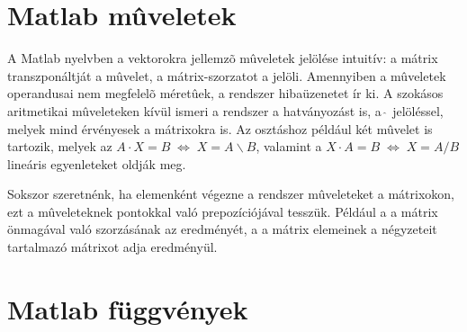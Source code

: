 \section{Matlab mûveletek}\label{sec:MAT:muv}

A {Matlab} nyelvben a vektorokra jellemzõ mûveletek jelölése
intuitív: a mátrix transzponáltját a  mûvelet, a
mátrix-szorzatot a  jelöli. Amennyiben a
mûveletek operandusai nem megfelelõ méretûek, a rendszer
hibaüzenetet ír ki. A szokásos aritmetikai mûveleteken kívül
ismeri a rendszer a hatványozást is, a $\hat{~}$ jelöléssel,
melyek mind érvényesek a mátrixokra is. Az osztáshoz például két
mûvelet is tartozik, melyek az $A\cdot X = B\; \Leftrightarrow \;
X=A\backslash B$, valamint a $X\cdot A = B \; \Leftrightarrow \;
X=A/B$ lineáris egyenleteket oldják meg.

Sokszor szeretnénk, ha elemenként végezne a rendszer mûveleteket a mátrixokon, ezt a mûveleteknek pontokkal való prepozíciójával tesszük. Például a  a mátrix önmagával való szorzásának az eredményét, a  a mátrix elemeinek a négyzeteit tartalmazó mátrixot adja eredményül.

\section{Matlab függvények}\label{sec:MAT:fugg}

